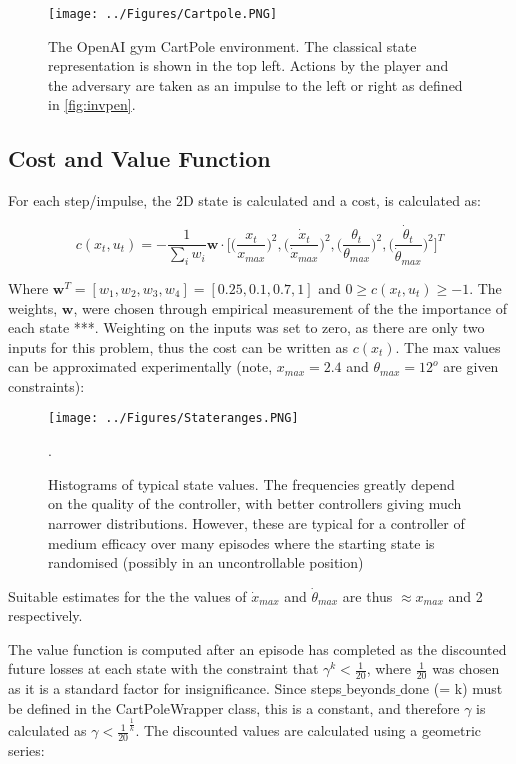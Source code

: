 \documentclass[main.tex]{subfiles}
\begin{document}
\begin{figure}[H]
   \centering
   \texttt{[image: ../Figures/Cartpole.PNG]}
   \caption{\label{fig:openai} The OpenAI gym CartPole environment. The classical state representation is shown in the top left. Actions by the player and the adversary are taken as an impulse to the left or right as defined in \ref{fig:invpen}.}
\end{figure}

\subsection{Cost and Value Function}

For each step/impulse, the 2D state is calculated and a cost, is calculated as:

\begin{equation}
   c(x_t, u_t) = - \frac{1}{\sum_{i} w_i} \boldsymbol{w} \cdot \bigg[ \Big(\frac{x_t}{x_{max}}\Big)^2,  \Big(\frac{\dot{x}_t}{\dot{x}_{max}}\Big)^2,  \Big(\frac{\theta_t}{\theta_{max}}\Big)^2,  \Big(\frac{\dot{\theta}_t}{\dot{\theta}_{max}}\Big)^2 \bigg]^T
\end{equation}

Where $\boldsymbol{w}^T = [w_1, w_2, w_3, w_4] = [0.25, 0.1, 0.7, 1]$ and $0 \geq c(x_t, u_t) \geq -1$. The weights, $\boldsymbol{w}$, were chosen through empirical measurement of the the importance of each state ***. Weighting on the inputs was set to zero, as there are only two inputs for this problem, thus the cost can be written as $c(x_t)$. The max values can be approximated experimentally (note, $x_{max} = 2.4$ and $\theta_{max} = 12^o$ are given constraints):

\begin{figure}[H]
   \centering
   \texttt{[image: ../Figures/Stateranges.PNG]}
   \caption{\label{fig:ranges} Histograms of typical state values. The frequencies greatly depend on the quality of the controller, with better controllers giving much narrower distributions. However, these are typical for a controller of medium efficacy over many episodes where the starting state is randomised (possibly in an uncontrollable position)}.
\end{figure}

Suitable estimates for the the values of $\dot{x}_{max}$ and $\dot{\theta}_{max}$ are thus $\approx x_{max}$ and 2 respectively.

The value function is computed after an episode has completed as the discounted future losses at each state with the constraint that $\gamma^{k} < \frac{1}{20}$, where $\frac{1}{20}$ was chosen as it is a standard factor for insignificance. Since steps$\_$beyonds$\_$done (= k) must be defined in the CartPoleWrapper class, this is a constant, and therefore $\gamma$ is calculated as $\gamma < \frac{1}{20}^{\frac{1}{k}}$. The discounted values are calculated using a geometric series:
\end{document}

